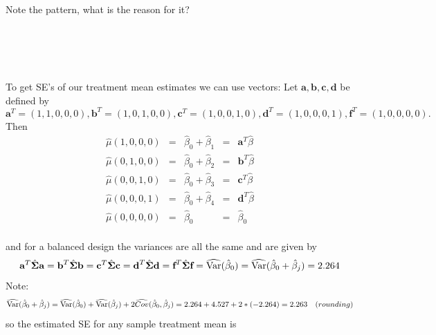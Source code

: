 Note the pattern, what is the reason for it?\\~\\~\\~\\~\\

\newpage

To get SE's of our treatment mean estimates we can use vectors:  Let $\textbf{a},\textbf{b},\textbf{c},\textbf{d}$ be defined by 
$$\textbf{a}^{T}=(1,1,0,0,0), \textbf{b}^{T}=(1,0,1,0,0), \textbf{c}^{T}=(1,0,0,1,0), \textbf{d}^{T}=(1,0,0,0,1), \textbf{f}^{T}=(1,0,0,0,0).$$
Then
\[
\begin{array}{lclcl}
\hat\mu(1,0,0,0) & = & \hat\beta_0  + \hat\beta_1 & = & \textbf{a}^{T}\hat\beta \\
\hat\mu(0,1,0,0) & = & \hat\beta_0  + \hat\beta_2 & = & \textbf{b}^{T}\hat\beta \\
\hat\mu(0,0,1,0) & = & \hat\beta_0  + \hat\beta_3 & = & \textbf{c}^{T}\hat\beta \\
\hat\mu(0,0,0,1) & = & \hat\beta_0  + \hat\beta_4 & = & \textbf{d}^{T}\hat\beta \\
\hat\mu(0,0,0,0) & = & \hat\beta_0  & = & \hat\beta_0 
\end{array}
\]~\\
and for a balanced design the variances are all the same and are given by
$$\textbf{a}^{T} \hat{\boldsymbol{\Sigma}} \textbf{a} = \textbf{b}^{T} \hat{\boldsymbol{\Sigma}} \textbf{b} = \textbf{c}^{T} \hat{\boldsymbol{\Sigma}} \textbf{c} = \textbf{d}^{T} \hat{\boldsymbol{\Sigma}} \textbf{d} = \textbf{f}^{T}\hat{\boldsymbol{\Sigma}}\textbf{f}= \widehat{\mbox{Var}}(\hat\beta_0) = \widehat{\mbox{Var}}(\hat\beta_0 + \hat\beta_j) = 2.264$$
Note: 
$$\widehat{\mbox{Var}}(\hat\beta_0 + \hat\beta_j) =\widehat{\mbox{Var}}(\hat\beta_0)+\widehat{\mbox{Var}}(\hat\beta_j)+2\widehat{Cov}(\hat\beta_0,\hat\beta_j) = 2.264+4.527+2*(-2.264)=2.263~~~(rounding)$$
so the estimated SE for any sample treatment mean is \\~\\~\\~\\~\\~\\~\\

